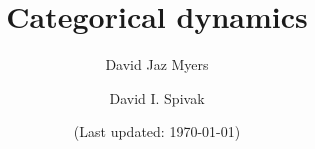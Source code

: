 \documentclass[11pt, book]{memoir}
\newcommand{\titlefont}{\normalfont\Huge\bfseries}
\theoremstyle{plain}
\theoremstyle{plain}
\theoremstyle{remark}
\begin{document}
\frontmatter

\title{\titlefont Categorical dynamics}

\author{\LARGE David Jaz Myers \and \LARGE David I. Spivak}



\date{\vfill (Last updated: \today)}

\maketitle
\thispagestyle{empty}



\clearpage
\tableofcontents*

\mainmatter














\appendix
\begingroup
\footnotesize



\backmatter
%

\printbibliography
\printindex
\end{document}
